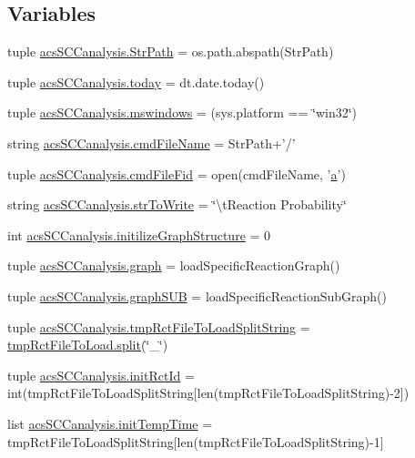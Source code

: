 \subsection*{Variables}
\begin{DoxyCompactItemize}
\item 
tuple \hyperlink{a00102_af8add8b37a9c8a7825c0e8f0e7dfd6c1}{acs\-S\-C\-Canalysis.\-Str\-Path} = os.\-path.\-abspath(Str\-Path)
\item 
tuple \hyperlink{a00102_a5498b0a6851ae4d3b2c3035093564e47}{acs\-S\-C\-Canalysis.\-today} = dt.\-date.\-today()
\item 
tuple \hyperlink{a00102_a2abf09620dd1dd990036c67c626b3dee}{acs\-S\-C\-Canalysis.\-mswindows} = (sys.\-platform == \char`\"{}win32\char`\"{})
\item 
string \hyperlink{a00102_a32551f85ad3cd8080b8ad81828276368}{acs\-S\-C\-Canalysis.\-cmd\-File\-Name} = Str\-Path+'/'
\item 
tuple \hyperlink{a00102_a0a501feb02e67bd6a8ba75490709cf89}{acs\-S\-C\-Canalysis.\-cmd\-File\-Fid} = open(cmd\-File\-Name, '\hyperlink{a00035_a2ffdbad9ea59541e59cbd2b938e0770c}{a}')
\item 
string \hyperlink{a00102_a1966f0657c6b477eeb60bde732a201cc}{acs\-S\-C\-Canalysis.\-str\-To\-Write} = \char`\"{}\textbackslash{}t\-Reaction Probability\char`\"{}
\item 
int \hyperlink{a00102_ac6ad18bfc83e8ea3254897d46f990855}{acs\-S\-C\-Canalysis.\-initilize\-Graph\-Structure} = 0
\item 
tuple \hyperlink{a00102_ab45392da38059bf7557c22cbc73e5580}{acs\-S\-C\-Canalysis.\-graph} = load\-Specific\-Reaction\-Graph()
\item 
tuple \hyperlink{a00102_ae307841da4a073fad4f6eaa172b0b970}{acs\-S\-C\-Canalysis.\-graph\-S\-U\-B} = load\-Specific\-Reaction\-Sub\-Graph()
\item 
tuple \hyperlink{a00102_add910e17b3f1fe61cdbaf8ce60ec0e20}{acs\-S\-C\-Canalysis.\-tmp\-Rct\-File\-To\-Load\-Split\-String} = \hyperlink{a00076_a4d1aa74fac80ae0275c056575fdb6626}{tmp\-Rct\-File\-To\-Load.\-split}(\char`\"{}\-\_\-\char`\"{})
\item 
tuple \hyperlink{a00102_a212643643fc6b002e8797f16633bb16d}{acs\-S\-C\-Canalysis.\-init\-Rct\-Id} = int(tmp\-Rct\-File\-To\-Load\-Split\-String\mbox{[}len(tmp\-Rct\-File\-To\-Load\-Split\-String)-\/2\mbox{]})
\item 
list \hyperlink{a00102_adc4403c4cfe080918c8b9da692c50509}{acs\-S\-C\-Canalysis.\-init\-Temp\-Time} = tmp\-Rct\-File\-To\-Load\-Split\-String\mbox{[}len(tmp\-Rct\-File\-To\-Load\-Split\-String)-\/1\mbox{]}

\end{DoxyCompactItemize}
